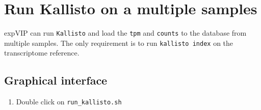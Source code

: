 \section{Run Kallisto on a multiple
samples}\label{run-kallisto-on-a-multiple-samples}

expVIP can run \lstinline!Kallisto! and load the \lstinline!tpm! and
\lstinline!counts! to the database from multiple samples. The only
requirement is to run \lstinline!kallisto index! on the transcriptome
reference.

\subsection{Graphical interface}\label{graphical-interface}

\begin{enumerate}
\def\labelenumi{\arabic{enumi}.}
\itemsep1pt\parskip0pt
\item
  Double click on \lstinline!run_kallisto.sh!

\end{enumerate}
